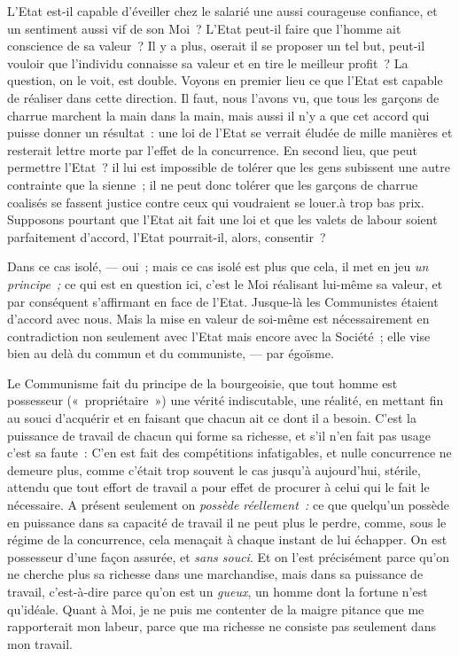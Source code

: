 \documentclass[french,twoside]{book} %
\begin{document}
L’Etat est-il capable d’éveiller chez le salarié une aussi courageuse confiance, et un sentiment aussi vif de son Moi ? L’Etat peut-il faire que l’homme ait conscience de sa valeur ? Il y a plus, oserait il se proposer un tel but, peut-il vouloir que l’individu connaisse sa valeur et en tire le meilleur profit ? La question, on le voit, est double. Voyons en premier lieu ce que l’Etat est capable de réaliser dans cette direction. Il faut, nous l’avons vu, que tous les garçons de charrue marchent la main dans la main, mais aussi il n’y a que cet accord qui puisse donner un résultat : une loi de l’Etat se verrait éludée de mille manières et resterait lettre morte par l’effet de la concurrence. En second lieu, que peut permettre l’Etat ? il lui est impossible de tolérer que les gens subissent une autre contrainte que la sienne ; il ne peut donc tolérer que les garçons de charrue coalisés se fassent justice contre ceux qui voudraient se louer.à trop bas prix. Supposons pourtant que l’Etat ait fait une loi et que les valets de labour soient parfaitement d’accord, l’Etat pourrait-il, alors, consentir ?\par
Dans ce cas isolé, — oui ; mais ce cas isolé est plus que cela, il met en jeu \emph{un principe ;} ce qui est en question ici, c’est le Moi réalisant lui-même sa valeur, et par conséquent s’affirmant en face de l’Etat. Jusque-là les Communistes étaient d’accord avec nous. Mais la mise en valeur de soi-même est nécessairement en contradiction non seulement avec l’Etat mais encore avec la Société ; elle vise bien au delà du commun et du communiste, — par égoïsme.\par
Le Communisme fait du principe de la bourgeoisie, que tout homme est possesseur (« propriétaire ») une vérité indiscutable, une réalité, en mettant fin  au souci d’acquérir et en faisant que chacun ait ce dont il a besoin. C’est la puissance de travail de chacun qui forme sa richesse, et s’il n’en fait pas usage c’est sa faute : C’en est fait des compétitions infatigables, et nulle concurrence ne demeure plus, comme c’était trop souvent le cas jusqu’à aujourd’hui, stérile, attendu que tout effort de travail a pour effet de procurer à celui qui le fait le nécessaire. A présent seulement on \emph{possède réellement :} ce que quelqu’un possède en puissance dans sa capacité de travail il ne peut plus le perdre, comme, sous le régime de la concurrence, cela menaçait à chaque instant de lui échapper. On est possesseur d’une façon assurée, et \emph{sans souci}. Et on l’est précisément parce qu’on ne cherche plus sa richesse dans une marchandise, mais dans sa puissance de travail, c’est-à-dire parce qu’on est un \emph{gueux}, un homme dont la fortune n’est qu’idéale. Quant à Moi, je ne puis me contenter de la maigre pitance que me rapporterait mon labeur, parce que ma richesse ne consiste pas seulement dans mon travail.\par
\end{document}
